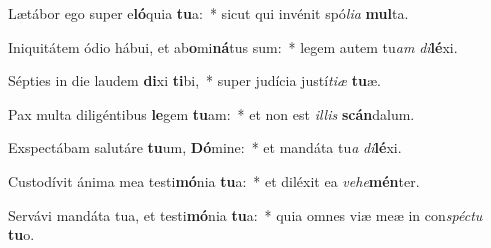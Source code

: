 \item Lætábor ego super e\textbf{ló}quia \textbf{tu}a:~* sicut qui invénit spó\textit{li}\textit{a} \textbf{mul}ta.
\item Iniquitátem ódio hábui, et ab\textbf{o}mi\textbf{ná}tus sum:~* legem autem tu\textit{am} \textit{di}\textbf{lé}xi.
\item Sépties in die laudem \textbf{di}xi \textbf{ti}bi,~* super judícia justí\textit{ti}\textit{æ} \textbf{tu}æ.
\item Pax multa diligéntibus \textbf{le}gem \textbf{tu}am:~* et non est \textit{il}\textit{lis} \textbf{scán}dalum.
\item Exspectábam salutáre \textbf{tu}um, \textbf{Dó}mine:~* et mandáta tu\textit{a} \textit{di}\textbf{lé}xi.
\item Custodívit ánima mea testi\textbf{mó}nia \textbf{tu}a:~* et diléxit ea \textit{ve}\textit{he}\textbf{mén}ter.
\item Servávi mandáta tua, et testi\textbf{mó}nia \textbf{tu}a:~* quia omnes viæ meæ in con\textit{spéc}\textit{tu} \textbf{tu}o.

